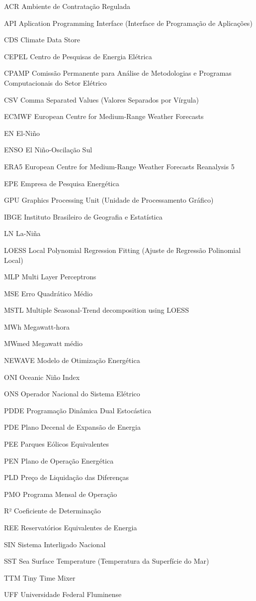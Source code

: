 \documentclass[
  12pt,				                                                                                                          %
  oneside,                                                                                                              %
  a4paper,			                                                                                                        %
  chapter = Title,		                                                                                                  %
  section = Title,		                                                                                                  %
  subsection = Title,	                                                                                                  %
  english,			                                                                                                        %
  brazil,			                                                                                                          %
  sumario = tradicional
  ]{abntex2-uff}
\begin{document}
\begin{siglas}
  \item[ACR] Ambiente de Contratação Regulada
  \item[API] Aplication Programming Interface (Interface de Programação de Aplicações)
  \item[CDS] Climate Data Store
  \item[CEPEL] Centro de Pesquisas de Energia Elétrica
  \item[CPAMP] Comissão Permanente para Análise de Metodologias e Programas Computacionais do Setor Elétrico
  \item[CSV] Comma Separated Values (Valores Separados por Vírgula)
  \item[ECMWF] European Centre for Medium-Range Weather Forecasts
  \item[EN] El-Niño
  \item[ENSO] El Niño-Oscilação Sul
  \item[ERA5] European Centre for Medium-Range Weather Forecasts Reanalysis 5
  \item[EPE] Empresa de Pesquisa Energética
  \item[GPU] Graphics Processing Unit (Unidade de Processamento Gráfico)
  \item[IBGE] Instituto Brasileiro de Geografia e Estatística
  \item[LN] La-Niña
  \item[LOESS] Local Polynomial Regression Fitting (Ajuste de Regressão Polinomial Local)
  \item[MLP] Multi Layer Perceptrons
  \item[MSE] Erro Quadrático Médio
  \item[MSTL] Multiple Seasonal-Trend decomposition using LOESS
  \item[MWh] Megawatt-hora
  \item[MWmed] Megawatt médio
  \item[NEWAVE] Modelo de Otimização Energética
  \item[ONI] Oceanic Niño Index
  \item[ONS] Operador Nacional do Sistema Elétrico
  \item[PDDE] Programação Dinâmica Dual Estocástica
  \item[PDE] Plano Decenal de Expansão de Energia
  \item[PEE] Parques Eólicos Equivalentes
  \item[PEN] Plano de Operação Energética
  \item[PLD] Preço de Liquidação das Diferenças
  \item[PMO] Programa Mensal de Operação
  \item[R²] Coeficiente de Determinação
  \item[REE] Reservatórios Equivalentes de Energia
  \item[SIN] Sistema Interligado Nacional
  \item[SST] Sea Surface Temperature (Temperatura da Superfície do Mar)
  \item[TTM] Tiny Time Mixer
  \item[UFF] Universidade Federal Fluminense
\end{siglas}
\end{document}
